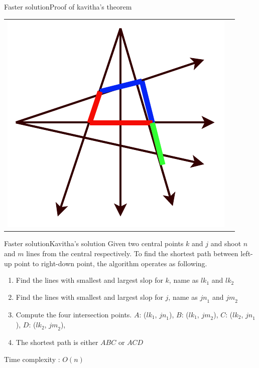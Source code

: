 \documentclass{beamer}
\begin{document}
\begin{frame}{Faster solution}{Proof of kavitha's theorem}
\begin{center}
\begin{tabular}{c c}
\begin{minipage}{0.4\textwidth}
            \includegraphics[width=\linewidth]{more_edges_2.pdf}
        \end{minipage} 
    \end{tabular}
    \end{center}
\end{frame}

\begin{frame}{Faster solution}{Kavitha's solution}
    Given two central points $k$ and $j$ and shoot $n$ and $m$ lines from the central respectively. To find the shortest path between left-up point to right-down point, the algorithm operates as following.
    \begin{enumerate}
        \item Find the lines with smallest and largest slop for $k$, name as ${lk}_1$ and ${lk}_2$
        \item Find the lines with smallest and largest slop for $j$, name as ${jn}_1$ and ${jm}_2$
        \item Compute the four intersection points. $A$: (${lk}_1$, ${jn}_1$),  $B$: (${lk}_1$, ${jm}_2$), $C$: (${lk}_2$, ${jn}_1$), $D$: (${lk}_2$, ${jm}_2$), 
        \item The shortest path is either $ABC$ or $ACD$
    \end{enumerate}
    Time complexity : $O(n)$
\end{frame}
\end{document}
